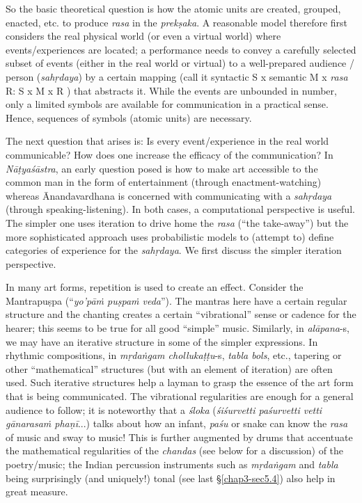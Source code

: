 So the basic theoretical question is how the atomic units are created, grouped, enacted, etc. to produce \textsl{rasa} in the \textsl{prekṣaka}. A reasonable model therefore first considers the real physical world (or even a virtual world) where events/experiences are located; a performance needs to convey a carefully selected subset of events (either in the real world or virtual) to a well-prepared audience / person (\textsl{sahṛdaya}) by a certain mapping (call it syntactic S x semantic M x \textsl{rasa} R: S x M x R ) that abstracts it. While the events are unbounded in number, only a limited symbols are available for communication in a practical sense. Hence, sequences of symbols (atomic units) are necessary.

The next question that arises is: Is every event/experience in the real world communicable? How does one increase the efficacy of the communication? In \textsl{Nāṭyaśāstra}, an early question posed is how to make art accessible to the common man in the form of entertainment (through enactment-watching) whereas Ānandavardhana is concerned with communicating with a \textsl{sahṛdaya} (through speaking-listening). In both cases, a computational perspective is useful. The simpler one uses iteration to drive home the \textsl{rasa} (“the take-away”) but the more sophisticated approach uses probabilistic models to (attempt to) define categories of experience for the \textsl{sahṛdaya}. We first discuss the simpler iteration perspective. 

In many art forms, repetition is used to create an effect. Consider the Mantrapuṣpa (“\textsl{yo’pāṁ puṣpaṁ veda}”). The mantras here have a certain regular structure and the chanting creates a certain “vibrational” sense or cadence for the hearer; this seems to be true for all good “simple” music. Similarly, in \textsl{alāpana}-s, we may have an iterative structure in some of the simpler expressions. In rhythmic compositions, in \textsl{mṛdaṅgam chollukaṭṭu}-s, \textsl{tabla bols}, etc., tapering or other “mathematical” structures (but with an element of iteration) are often used. Such iterative structures help a layman to grasp the essence of the art form that is being communicated. The vibrational regularities are enough for a general audience to follow; it is noteworthy that a \textsl{śloka} (\textsl{śiśurvetti paśurvetti vetti gānarasaṁ phaṇī}...) talks about how an infant, \textsl{paśu} or snake can know the \textsl{rasa} of music and sway to music! This is further augmented by drums that accentuate the mathematical regularities of the \textsl{chandas} (see below for a discussion) of the poetry/music; the Indian percussion instruments such as \textsl{mṛdaṅgam} and \textsl{tabla} being surprisingly (and uniquely!) tonal (see last \S\ref{chap3-sec5.4}) also help in great measure. 

